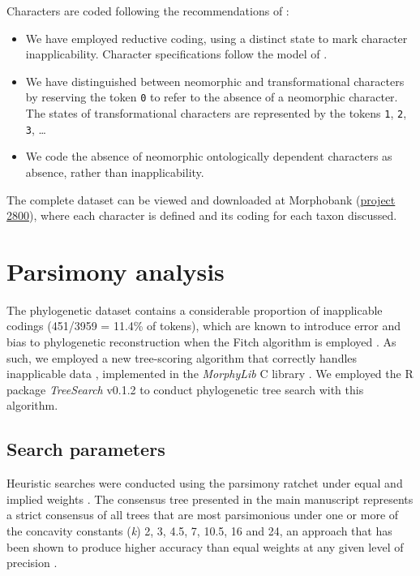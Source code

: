 \documentclass[openany]{book}
\theoremstyle{definition}
\theoremstyle{definition}
\theoremstyle{definition}
\theoremstyle{remark}
\begin{document}
Characters are coded following the recommendations of
\citet{Brazeau2018}:

\begin{itemize}
\item
  We have employed reductive coding, using a distinct state to mark
  character inapplicability. Character specifications follow the model
  of \citet{Sereno2007}.
\item
  We have distinguished between neomorphic and transformational
  characters \citep[sensu][]{Sereno2007} by reserving the token
  \texttt{0} to refer to the absence of a neomorphic character. The
  states of transformational characters are represented by the tokens
  \texttt{1}, \texttt{2}, \texttt{3}, \ldots{}
\item
  We code the absence of neomorphic ontologically dependent characters
  \citep[sensu][]{Vogt2017} as absence, rather than inapplicability.
\end{itemize}

The complete dataset can be viewed and downloaded at Morphobank
(\href{https://morphobank.org/permalink/?P2800}{project 2800}), where
each character is defined and its coding for each taxon discussed.

\hypertarget{treesearch}{\chapter{Parsimony analysis}\label{treesearch}}

The phylogenetic dataset contains a considerable proportion of
inapplicable codings (451/3959 = 11.4\% of tokens), which are known to
introduce error and bias to phylogenetic reconstruction when the Fitch
algorithm is employed \citep{Maddison1993, Brazeau2018}. As such, we
employed a new tree-scoring algorithm that correctly handles
inapplicable data \citep{Brazeau2018}, implemented in the
\emph{MorphyLib} C library \citep{Brazeau2017Morphylib}. We employed the
R package \emph{TreeSearch} v0.1.2 \citep{Smith2018TreeSearch} to
conduct phylogenetic tree search with this algorithm.

\section{Search parameters}\label{search-parameters}

Heuristic searches were conducted using the parsimony ratchet
\citep{Nixon1999} under equal and implied weights \citep{Goloboff1997}.
The consensus tree presented in the main manuscript represents a strict
consensus of all trees that are most parsimonious under one or more of
the concavity constants (\emph{k}) 2, 3, 4.5, 7, 10.5, 16 and 24, an
approach that has been shown to produce higher accuracy than equal
weights at any given level of precision \citep{Smith2017}.
\end{document}
